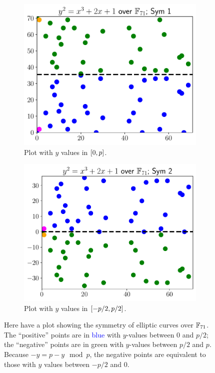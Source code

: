 \begin{figure}[p]
    \begin{subfigure}[t]{0.45\textwidth}
    \includegraphics[width=\textwidth]{plots/ec_finite/ec_finite_F_71_2_1_symmetry_1.pdf}
    \caption{Plot with $y$ values in $\left[ 0,p \right]$.}
    \label{fig:ec_finite_plots_symmetry_1}
    \end{subfigure}
    \begin{subfigure}[t]{0.45\textwidth}
    \includegraphics[width=\textwidth]{plots/ec_finite/ec_finite_F_71_2_1_symmetry_2.pdf}
    \caption{Plot with $y$ values in $\left[ -p/2,p/2 \right]$.}
    \label{fig:ec_finite_plots_symmetry_2}
    \end{subfigure}
\caption[Plots showing symmetry of elliptic curves over finite fields]{Here
    have a plot showing the symmetry of \glspl{elliptic curve} over $\mathbb{F}_{71}$.
    The ``positive'' points are in \textcolor{blue}{blue}
        with $y$-values between $0$ and $p/2$;
    the ``negative'' points are in \textcolor[rgb]{0,0.33,0}{green}
        with $y$-values between $p/2$ and $p$.
    Because $-y = p-y\mod p$,
    the negative points are equivalent to those with $y$ values
    between $-p/2$ and $0$.
    }
\label{fig:ec_finite_plots_symmetry}
\end{figure}
